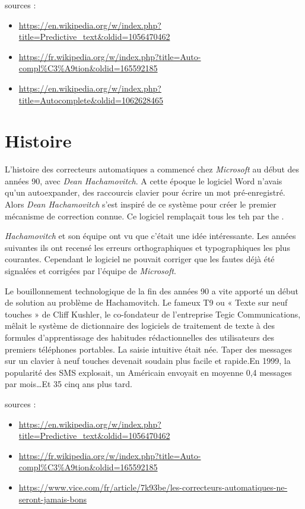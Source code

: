 \documentclass[final, 10pt]{report}
\begin{document}
\footnotesize
sources : 
\begin{itemize}
    \item \url{https://en.wikipedia.org/w/index.php?title=Predictive_text&oldid=1056470462}
    \item \url{https://fr.wikipedia.org/w/index.php?title=Auto-compl\%C3\%A9tion&oldid=165592185}
    \item \url{https://en.wikipedia.org/w/index.php?title=Autocomplete&oldid=1062628465}
\end{itemize}
\normalsize

\section{Histoire}

    L’histoire des correcteurs automatiques a commencé chez \emph{Microsoft} au début des années 90, avec \emph{Dean Hachamovitch}.
    A cette époque le logiciel Word n'avais qu'un \og autoexpander\fg{}, des raccourcis clavier pour écrire un mot pré-enregistré.
    Alors \emph{Dean Hachamovitch} s'est inspiré de ce système pour créer le premier mécanisme de correction connue.
    Ce logiciel remplaçait tous les \og teh\fg{} par \og the \fg{}.
    
    \emph{Hachamovitch} et son équipe ont vu que c'était une idée intéressante.
    Les années suivantes ils ont recensé les erreurs orthographiques et typographiques les plus courantes.
    Cependant le logiciel ne pouvait corriger que les fautes déjà été signalées et corrigées par l'équipe de \emph{Microsoft}.
    
    
    Le bouillonnement technologique de la fin des années 90 a vite apporté un début de solution au problème de Hachamovitch. Le fameux T9 ou « Texte sur neuf touches » de Cliff Kushler, le co-fondateur de l’entreprise Tegic Communications, mêlait le système de dictionnaire des logiciels de traitement de texte à des formules d’apprentissage des habitudes rédactionnelles des utilisateurs des premiers téléphones portables. La saisie intuitive était née. Taper des messages sur un clavier à neuf touches devenait soudain plus facile et rapide.En 1999, la popularité des SMS explosait, un Américain envoyait en moyenne 0,4 messages par mois\ldots Et 35 cinq ans plus tard.
    \cite{wesolowski_les_2021}

\footnotesize
sources : 
\begin{itemize}
    \item \url{https://en.wikipedia.org/w/index.php?title=Predictive_text&oldid=1056470462}
    \item \url{https://fr.wikipedia.org/w/index.php?title=Auto-compl\%C3\%A9tion&oldid=165592185}
    \item \url{https://www.vice.com/fr/article/7k93be/les-correcteurs-automatiques-ne-seront-jamais-bons}
\end{itemize}
\normalsize
\end{document}
